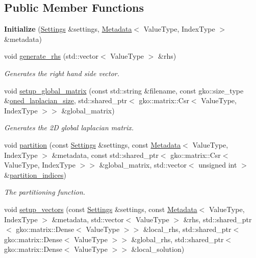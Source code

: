 \subsection*{Public Member Functions}
\begin{DoxyCompactItemize}
\item 
\mbox{\label{classschwz_1_1Initialize_a8ebf7bcf4c67d4ca6af0b5afba5a9a90}} 
{\bfseries Initialize} (\hyperlink{structschwz_1_1Settings}{Settings} \&settings, \hyperlink{structschwz_1_1Metadata}{Metadata}$<$ Value\+Type, Index\+Type $>$ \&metadata)
\item 
void \hyperlink{classschwz_1_1Initialize_a9dee6b55c599df30410cdf45819b3e28}{generate\+\_\+rhs} (std\+::vector$<$ Value\+Type $>$ \&rhs)
\begin{DoxyCompactList}\small\item\em Generates the right hand side vector. \end{DoxyCompactList}\item 
void \hyperlink{classschwz_1_1Initialize_af655816bbed181e0a243efa7e35e942f}{setup\+\_\+global\+\_\+matrix} (const std\+::string \&filename, const gko\+::size\+\_\+type \&\hyperlink{structschwz_1_1Metadata_a1333605c0573688ce4d71173f52ef2b4}{oned\+\_\+laplacian\+\_\+size}, std\+::shared\+\_\+ptr$<$ gko\+::matrix\+::\+Csr$<$ Value\+Type, Index\+Type $>$$>$ \&global\+\_\+matrix)
\begin{DoxyCompactList}\small\item\em Generates the 2D global laplacian matrix. \end{DoxyCompactList}\item 
void \hyperlink{classschwz_1_1Initialize_a23a10058e35a442c564c0748b66dcb08}{partition} (const \hyperlink{structschwz_1_1Settings}{Settings} \&settings, const \hyperlink{structschwz_1_1Metadata}{Metadata}$<$ Value\+Type, Index\+Type $>$ \&metadata, const std\+::shared\+\_\+ptr$<$ gko\+::matrix\+::\+Csr$<$ Value\+Type, Index\+Type $>$$>$ \&global\+\_\+matrix, std\+::vector$<$ unsigned int $>$ \&\hyperlink{classschwz_1_1Initialize_a007426e21221298b6dca9b7c9fbd1c10}{partition\+\_\+indices})
\begin{DoxyCompactList}\small\item\em The partitioning function. \end{DoxyCompactList}\item 
void \hyperlink{classschwz_1_1Initialize_af8e2c507404900e2507f6b44b16ca4b7}{setup\+\_\+vectors} (const \hyperlink{structschwz_1_1Settings}{Settings} \&settings, const \hyperlink{structschwz_1_1Metadata}{Metadata}$<$ Value\+Type, Index\+Type $>$ \&metadata, std\+::vector$<$ Value\+Type $>$ \&rhs, std\+::shared\+\_\+ptr$<$ gko\+::matrix\+::\+Dense$<$ Value\+Type $>$$>$ \&local\+\_\+rhs, std\+::shared\+\_\+ptr$<$ gko\+::matrix\+::\+Dense$<$ Value\+Type $>$$>$ \&global\+\_\+rhs, std\+::shared\+\_\+ptr$<$ gko\+::matrix\+::\+Dense$<$ Value\+Type $>$$>$ \&local\+\_\+solution)
$$
\end{DoxyCompactItemize}
